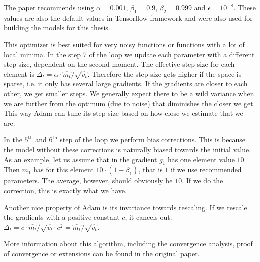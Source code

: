 The paper recommends using $\alpha = 0.001$, $\beta_1=0.9$, $\beta_2=0.999$ and $\epsilon=10^{-8}$. These values are also the default values in Tensorflow framework and were also used for building the models for this thesis.

This optimizer is best suited for very noisy functions or functions with a lot of local minima. In the step 7 of the loop we update each parameter with a different step size, dependent on the second moment. The effective step size for each element is $\Delta_t=\alpha\cdot\widehat{m_t}/\sqrt{\widehat{v_t}}$. Therefore the step size gets higher if the space is sparse, i.e. it only has several large gradients. If the gradients are closer to each other, we get smaller steps. We generally expect there to be a wild variance when we are further from the optimum (due to noise) that diminishes the closer we get. This way Adam can tune its step size based on how close we estimate that we are. 

In the $5^\text{th}$ and $6^\text{th}$ step of the loop we perform bias corrections. This is because the model without these corrections is naturally biased towards the initial value. As an example, let us assume that in the gradient $g_1$ has one element value $10$. Then $m_1$ has for this element $10\cdot(1-\beta_1)$, that is $1$ if we use recommended parameters. The average, however, should obviously be $10$. If we do the correction, this is exactly what we have.

Another nice property of Adam is its invariance towards rescaling. If we rescale the gradients with a positive constant $c$, it cancels out: $\Delta_t = c\cdot\widehat{m_t}/\sqrt{\widehat{v_t}\cdot c^2}=\widehat{m_t}/\sqrt{\widehat{v_t}}$.

More information about this algorithm, including the convergence analysis, proof of convergence or extensions can be found in the original paper.